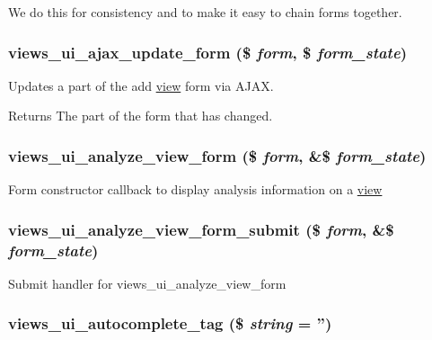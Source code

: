 We do this for consistency and to make it easy to chain forms together. \hypertarget{admin_8inc_acd279b8aabc8e5694badc5a140b11aa6}{
\subsubsection[{views\_\-ui\_\-ajax\_\-update\_\-form}]{\setlength{\rightskip}{0pt plus 5cm}views\_\-ui\_\-ajax\_\-update\_\-form (\$ {\em form}, \/  \$ {\em form\_\-state})}}
\label{admin_8inc_acd279b8aabc8e5694badc5a140b11aa6}
Updates a part of the add \hyperlink{classview}{view} form via AJAX.

\begin{DoxyReturn}{Returns}
The part of the form that has changed. 
\end{DoxyReturn}
\hypertarget{admin_8inc_ab554cb570b901a617cdaf7deb73e809d}{
\subsubsection[{views\_\-ui\_\-analyze\_\-view\_\-form}]{\setlength{\rightskip}{0pt plus 5cm}views\_\-ui\_\-analyze\_\-view\_\-form (\$ {\em form}, \/  \&\$ {\em form\_\-state})}}
\label{admin_8inc_ab554cb570b901a617cdaf7deb73e809d}
Form constructor callback to display analysis information on a \hyperlink{classview}{view} \hypertarget{admin_8inc_aa1090e8a74ff37716f6b2365f188c73b}{
\subsubsection[{views\_\-ui\_\-analyze\_\-view\_\-form\_\-submit}]{\setlength{\rightskip}{0pt plus 5cm}views\_\-ui\_\-analyze\_\-view\_\-form\_\-submit (\$ {\em form}, \/  \&\$ {\em form\_\-state})}}
\label{admin_8inc_aa1090e8a74ff37716f6b2365f188c73b}
Submit handler for views\_\-ui\_\-analyze\_\-view\_\-form \hypertarget{admin_8inc_a1a3a91dbf973532f39cee36c1d99c87b}{
\subsubsection[{views\_\-ui\_\-autocomplete\_\-tag}]{\setlength{\rightskip}{0pt plus 5cm}views\_\-ui\_\-autocomplete\_\-tag (\$ {\em string} = {\ttfamily ''})}}
